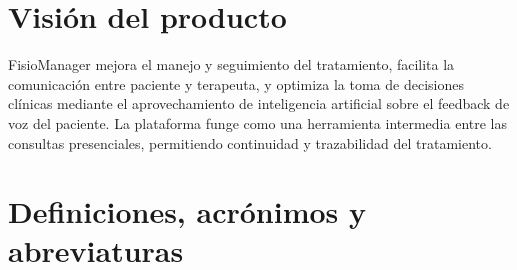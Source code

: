 \section{Visión del producto}

FisioManager mejora el manejo y seguimiento del tratamiento, facilita la comunicación entre paciente y terapeuta, y optimiza la toma de decisiones clínicas mediante el aprovechamiento de inteligencia artificial sobre el feedback de voz del paciente. La plataforma funge como una herramienta intermedia entre las consultas presenciales, permitiendo continuidad y trazabilidad del tratamiento.

\section{Definiciones, acrónimos y abreviaturas}

